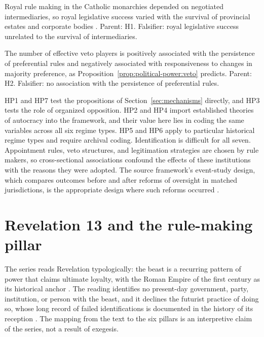 \documentclass[11pt,letterpaper]{article}
\theoremstyle{definition}
\theoremstyle{remark}
\begin{document}
\begin{description}[font=\normalfont\itshape, leftmargin=1.5em, style=nextline]
\item[HP6, brokered absolutism.] Royal rule making in the Catholic monarchies depended on negotiated intermediaries, so royal legislative success varied with the survival of provincial estates and corporate bodies \citep{beik1985}. Parent: H1. Falsifier: royal legislative success unrelated to the survival of intermediaries.
\item[HP7, veto trade-off.] The number of effective veto players is positively associated with the persistence of preferential rules and negatively associated with responsiveness to changes in majority preference, as Proposition~\ref{prop:political-power:veto} predicts. Parent: H2. Falsifier: no association with the persistence of preferential rules.
\end{description}

HP1 and HP7 test the propositions of Section~\ref{sec:mechanisms} directly, and HP3 tests the role of organized opposition. HP2 and HP4 import established theories of autocracy into the framework, and their value here lies in coding the same variables across all six regime types. HP5 and HP6 apply to particular historical regime types and require archival coding. Identification is difficult for all seven. Appointment rules, veto structures, and legitimation strategies are chosen by rule makers, so cross-sectional associations confound the effects of these institutions with the reasons they were adopted. The source framework's event-study design, which compares outcomes before and after reforms of oversight in matched jurisdictions, is the appropriate design where such reforms occurred \citep[Section~9]{largo2026hbs}.

\section{Revelation 13 and the rule-making pillar}
\label{sec:revelation}

The series reads Revelation typologically: the beast is a recurring pattern of power that claims ultimate loyalty, with the Roman Empire of the first century as its historical anchor \citep{bauckham1993,koester2014}. The reading identifies no present-day government, party, institution, or person with the beast, and it declines the futurist practice of doing so, whose long record of failed identifications is documented in the history of its reception \citep{fuller1995,mcginn1998}. The mapping from the text to the six pillars is an interpretive claim of the series, not a result of exegesis.
\end{document}
